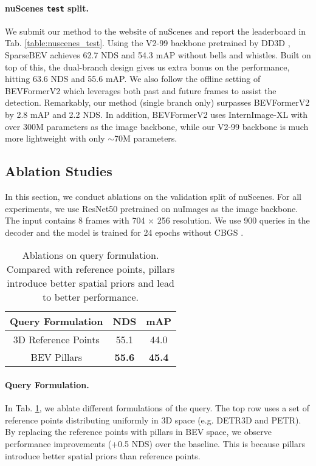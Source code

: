 \documentclass[10pt,twocolumn,letterpaper]{article}
\begin{document}
\vspace{-10pt}
\paragraph{nuScenes \texttt{test} split.} We submit our method to the website of nuScenes and report the leaderboard in Tab. \ref{table:nuscenes_test}.
Using the V2-99 \cite{vovnet2} backbone pretrained by DD3D \cite{dd3d}, SparseBEV achieves 62.7 NDS and 54.3 mAP without bells and whistles.
Built on top of this, the dual-branch design gives us extra bonus on the performance, hitting 63.6 NDS and 55.6 mAP.
We also follow the offline setting of BEVFormerV2 \cite{bevformerv2} which leverages both past and future frames to assist the detection.
Remarkably, our method (single branch only) surpasses BEVFormerV2 by 2.8 mAP and 2.2 NDS.
In addition, BEVFormerV2 uses InternImage-XL \cite{internimage} with over 300M parameters as the image backbone, while our V2-99 backbone is much more lightweight with only $\sim$70M parameters.

\subsection{Ablation Studies}

In this section, we conduct ablations on the validation split of nuScenes. For all experiments, we use ResNet50 pretrained on nuImages \cite{nuscenes} as the image backbone. The input contains 8 frames with 704 $\times$ 256 resolution. We use 900 queries in the decoder and the model is trained for 24 epochs without CBGS \cite{cbgs}.

\begin{table}[t]
  \centering
  \begin{tabular}{c|cc}
    \toprule
    Query Formulation & NDS & mAP \\
    \midrule
    3D Reference Points & 55.1 & 44.0 \\
    BEV Pillars & \textbf{55.6} & \textbf{45.4} \\
    \bottomrule
  \end{tabular}
  \caption{Ablations on query formulation. Compared with reference points, pillars introduce better spatial priors and lead to better performance.}
  \label{table:ablation_query}
\end{table}

\vspace{-5pt}
\paragraph{Query Formulation.} In Tab. \ref{table:ablation_query}, we ablate different formulations of the query. The top row uses a set of reference points distributing uniformly in 3D space (e.g. DETR3D and PETR). By replacing the reference points with pillars in BEV space, we observe performance improvements (+0.5 NDS) over the baseline. This is because pillars introduce better spatial priors than reference points.
\end{document}
